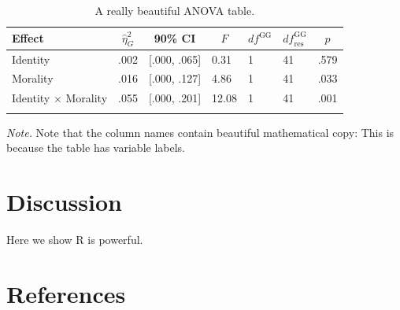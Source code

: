 \documentclass[
  english,
  man,floatsintext]{apa6}
\begin{document}
\begin{table}[tbp]

\begin{center}
\begin{threeparttable}

\caption{\label{tab:anovaTable}A really beautiful ANOVA table.}

\begin{tabular}{lllllll}
\toprule
Effect & \multicolumn{1}{c}{$\hat{\eta}^2_G$} & \multicolumn{1}{c}{90\% CI} & \multicolumn{1}{c}{$F$} & \multicolumn{1}{c}{$\mathit{df}^{\mathrm{GG}}$} & \multicolumn{1}{c}{$\mathit{df}_{\mathrm{res}}^{\mathrm{GG}}$} & \multicolumn{1}{c}{$p$}\\
\midrule
Identity & .002 & {}[.000, .065] & 0.31 & 1 & 41 & .579\\
Morality & .016 & {}[.000, .127] & 4.86 & 1 & 41 & .033\\
Identity $\times$ Morality & .055 & {}[.000, .201] & 12.08 & 1 & 41 & .001\\
\bottomrule
\addlinespace
\end{tabular}

\begin{tablenotes}[para]
\normalsize{\textit{Note.} Note that the column names contain beautiful mathematical copy: This is because the table has variable labels.}
\end{tablenotes}

\end{threeparttable}
\end{center}

\end{table}

\section{Discussion}\label{discussion}

Here we show R is powerful.

\newpage

\section{References}\label{references}
\end{document}
